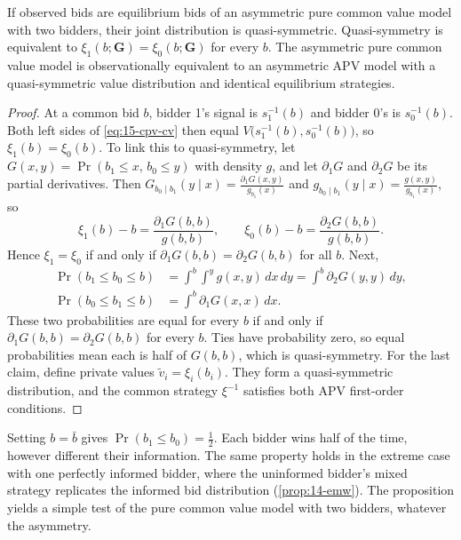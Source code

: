 \begin{proposition}\label{prop:15-cpv-quasisym}
If observed bids are equilibrium bids of an asymmetric pure common value model with two bidders, their joint
distribution is quasi-symmetric. Quasi-symmetry is equivalent to $\xi_1(b;\bm G)=\xi_0(b;\bm G)$ for every
$b$. The asymmetric pure common value model is observationally equivalent to an asymmetric APV model with a
quasi-symmetric value distribution and identical equilibrium strategies.
\end{proposition}

\begin{proof}
At a common bid $b$, bidder 1's signal is $s_1^{-1}(b)$ and bidder 0's is $s_0^{-1}(b)$. Both left sides of
\eqref{eq:15-cpv-cv} then equal $V\bigl(s_1^{-1}(b),s_0^{-1}(b)\bigr)$, so $\xi_1(b)=\xi_0(b)$. To link this to
quasi-symmetry, let $G(x,y)=\Pr(b_1\le x,\,b_0\le y)$ with density $g$, and let $\partial_1G$ and $\partial_2G$
be its partial derivatives. Then
$G_{b_0\mid b_1}(y\mid x)=\frac{\partial_1G(x,y)}{g_{b_1}(x)}$ and $g_{b_0\mid b_1}(y\mid x)=\frac{g(x,y)}{g_{b_1}(x)}$,
so
\begin{equation*}
  \xi_1(b)-b=\frac{\partial_1G(b,b)}{g(b,b)},\qquad \xi_0(b)-b=\frac{\partial_2G(b,b)}{g(b,b)} .
\end{equation*}
Hence $\xi_1=\xi_0$ if and only if $\partial_1G(b,b)=\partial_2G(b,b)$ for all $b$. Next,
\begin{align*}
  \Pr(b_1\le b_0\le b)&=\int^{b}\!\!\int^{y}g(x,y)\,dx\,dy=\int^{b}\partial_2G(y,y)\,dy,\\
  \Pr(b_0\le b_1\le b)&=\int^{b}\partial_1G(x,x)\,dx .
\end{align*}
These two probabilities are equal for every $b$ if and only if $\partial_1G(b,b)=\partial_2G(b,b)$ for every
$b$. Ties have probability zero, so equal probabilities mean each is half of $G(b,b)$, which is
quasi-symmetry. For the last claim, define private values $\tilde v_i=\xi_i(b_i)$. They form a
quasi-symmetric distribution, and the common strategy $\xi^{-1}$ satisfies both APV first-order conditions.
\end{proof}

Setting $b=\bar b$ gives $\Pr(b_1\le b_0)=\frac12$. Each bidder wins half of the time, however different
their information. The same property holds in the extreme case with one perfectly informed bidder, where the
uninformed bidder's mixed strategy replicates the informed bid distribution (\cref{prop:14-emw}). The
proposition yields a simple test of the pure common value model with two bidders, whatever the asymmetry.

